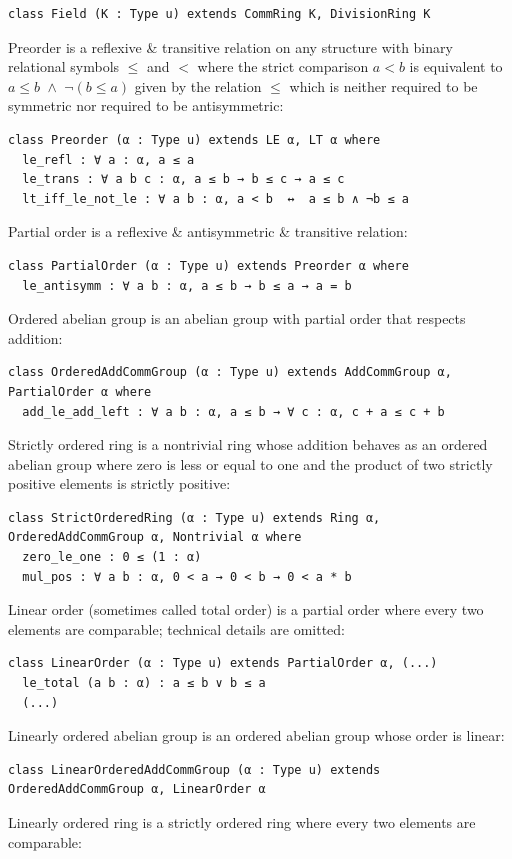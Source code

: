 \documentclass[]{article}
\renewcommand{\.}{\hskip .75pt}
\DeclareMathOperator{\aand}{\;\wedge\;}
\begin{document}
\begin{lstlisting}
class Field (K : Type u) extends CommRing K, DivisionRing K
\end{lstlisting}
Preorder is a reflexive \& transitive relation on any structure with binary relational symbols $\le$ and $<$
where the strict comparison $a < b$ is equivalent to $a \le b \aand \neg (b \le a)$ given by the relation $\le$
which is neither required to be symmetric nor required to be antisymmetric:
\begin{lstlisting}
class Preorder (α : Type u) extends LE α, LT α where
  le_refl : ∀ a : α, a ≤ a
  le_trans : ∀ a b c : α, a ≤ b → b ≤ c → a ≤ c
  lt_iff_le_not_le : ∀ a b : α, a < b  ↔  a ≤ b ∧ ¬b ≤ a 
\end{lstlisting}
Partial order is a reflexive \& antisymmetric \& transitive relation:
\begin{lstlisting}
class PartialOrder (α : Type u) extends Preorder α where
  le_antisymm : ∀ a b : α, a ≤ b → b ≤ a → a = b
\end{lstlisting}
Ordered abelian group is an abelian group with partial order that respects addition:
\begin{lstlisting}
class OrderedAddCommGroup (α : Type u) extends AddCommGroup α, PartialOrder α where
  add_le_add_left : ∀ a b : α, a ≤ b → ∀ c : α, c + a ≤ c + b
\end{lstlisting}
Strictly ordered ring is a nontrivial ring whose addition behaves as an ordered abelian group
where zero is less or equal to one and the product of two strictly positive elements is strictly positive:
\begin{lstlisting}
class StrictOrderedRing (α : Type u) extends Ring α, OrderedAddCommGroup α, Nontrivial α where
  zero_le_one : 0 ≤ (1 : α)
  mul_pos : ∀ a b : α, 0 < a → 0 < b → 0 < a * b
\end{lstlisting}
Linear order (sometimes called total order) is a partial order where every two elements are comparable;
technical details are omitted:
\begin{lstlisting}
class LinearOrder (α : Type u) extends PartialOrder α, (...)
  le_total (a b : α) : a ≤ b ∨ b ≤ a
  (...)
\end{lstlisting}
Linearly ordered abelian group is an ordered abelian group whose order is linear:
\begin{lstlisting}
class LinearOrderedAddCommGroup (α : Type u) extends OrderedAddCommGroup α, LinearOrder α
\end{lstlisting}
Linearly ordered ring is a strictly ordered ring where every two elements are comparable:
\end{document}
